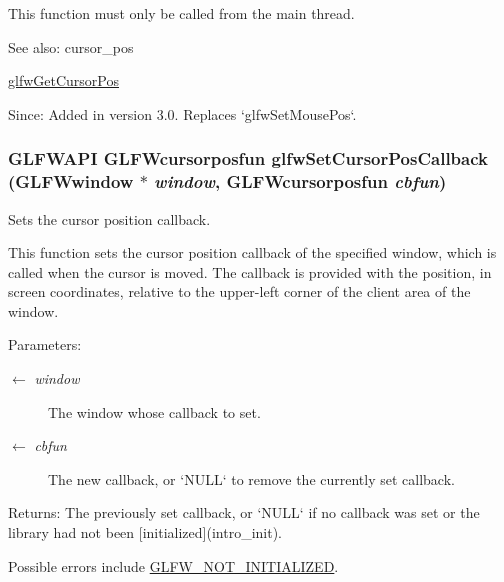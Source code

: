 This function must only be called from the main thread.

\begin{Desc}
\item[See also:]cursor\_\-pos 

\hyperlink{group__input_gd289438eb7cf53d11eca685373f44105}{glfwGetCursorPos}\end{Desc}
\begin{Desc}
\item[Since:]Added in version 3.0. Replaces `glfwSetMousePos`. \end{Desc}
\hypertarget{group__input_g9c49c0d3d3c775c3124726f1d902124d}{
\subsubsection[glfwSetCursorPosCallback]{\setlength{\rightskip}{0pt plus 5cm}GLFWAPI {\bf GLFWcursorposfun} glfwSetCursorPosCallback ({\bf GLFWwindow} $\ast$ {\em window}, \/  {\bf GLFWcursorposfun} {\em cbfun})}}
\label{group__input_g9c49c0d3d3c775c3124726f1d902124d}


Sets the cursor position callback. 

This function sets the cursor position callback of the specified window, which is called when the cursor is moved. The callback is provided with the position, in screen coordinates, relative to the upper-left corner of the client area of the window.

\begin{Desc}
\item[Parameters:]
\begin{description}
\item[\mbox{$\leftarrow$} {\em window}]The window whose callback to set. \item[\mbox{$\leftarrow$} {\em cbfun}]The new callback, or `NULL` to remove the currently set callback. \end{description}
\end{Desc}
\begin{Desc}
\item[Returns:]The previously set callback, or `NULL` if no callback was set or the library had not been \mbox{[}initialized\mbox{]}(intro\_\-init).\end{Desc}
Possible errors include \hyperlink{group__errors_g2374ee02c177f12e1fa76ff3ed15e14a}{GLFW\_\-NOT\_\-INITIALIZED}.

